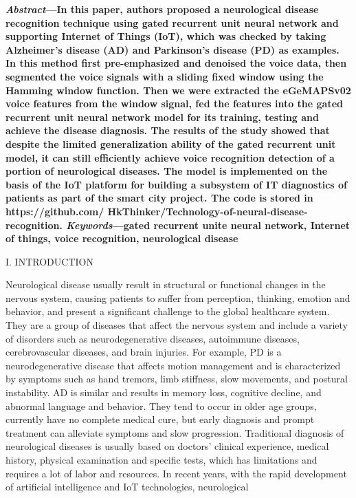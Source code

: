 \documentclass{article}
\begin{document}
\begin{multicols*}{2}
\textbf{\textit{Abstract}—In this paper, authors proposed a neurological
disease recognition technique using gated recurrent unit
neural network and supporting Internet of Things (IoT),
which was checked by taking Alzheimer’s disease (AD)
and Parkinson’s disease (PD) as examples. In this method
first pre-emphasized and denoised the voice data, then segmented the voice signals with a sliding fixed window using
the Hamming window function. Then we were extracted the
eGeMAPSv02 voice features from the window signal, fed
the features into the gated recurrent unit neural network
model for its training, testing and achieve the disease
diagnosis. The results of the study showed that despite
the limited generalization ability of the gated recurrent
unit model, it can still efficiently achieve voice recognition
detection of a portion of neurological diseases. The model is
implemented on the basis of the IoT platform for building
a subsystem of IT diagnostics of patients as part of the
smart city project. The code is stored in https://github.com/
HkThinker/Technology-of-neural-disease-recognition. %
\textit{Keywords}—gated recurrent unite neural network, Internet of things, voice recognition, neurological disease}
\begin{center}
I. INTRODUCTION
\end{center}
Neurological disease usually result in structural or
functional changes in the nervous system, causing patients to suffer from perception, thinking, emotion and
behavior, and present a significant challenge to the global
healthcare system. They are a group of diseases that
affect the nervous system and include a variety of disorders such as neurodegenerative diseases, autoimmune
diseases, cerebrovascular diseases, and brain injuries. For
example, PD is a neurodegenerative disease that affects
motion management and is characterized by symptoms
such as hand tremors, limb stiffness, slow movements,
and postural instability. AD is similar and results in
memory loss, cognitive decline, and abnormal language
and behavior. They tend to occur in older age groups,
currently have no complete medical cure, but early diagnosis and prompt treatment can alleviate symptoms and
slow progression. Traditional diagnosis of neurological
diseases is usually based on doctors’ clinical experience,
medical history, physical examination and specific tests,
which has limitations and requires a lot of labor and
resources. In recent years, with the rapid development of
artificial intelligence and IoT technologies, neurological

\end{multicols*}
\end{document}
